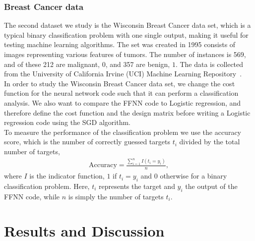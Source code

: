 \documentclass[english,notitlepage,reprint,nofootinbib]{revtex4-2}  %
\begin{document}
\subsubsection*{Breast Cancer data}
The second dataset we study is the Wisconsin Breast Cancer data set, which is a typical binary classification problem with one single output, making it useful for testing machine learning algorithms. The set was created in 1995 consists of images representing various features of tumors. The number of instances is 569, and of these 212 are malignant, $0$, and 357 are benign, $1$. The data is collected from the University of California Irvine (UCI) Machine Learning Repository~\cite{BreastCancerData}. 
\vspace{3mm}
\\ 
In order to study the Wisconsin Breast Cancer data set, we change the cost function for the neural network code such that it can perform a classification analysis. We also want to compare the FFNN code to Logistic regression, and therefore define the cost function and the design matrix before writing a Logistic regression code using the SGD algorithm. 
\vspace{3mm}
\\ 
To measure the performance of the classification problem we use the accuracy score, which is the number of correctly guessed targets $t_i$ divided by the total number of targets, 
\begin{align*}
    \text{Accuracy} = \frac{\sum^n_{i=1} I(t_i=y_i)}{n}, 
\end{align*}
where $I$ is the indicator function, $1$ if $t_i=y_i$ and $0$ otherwise for a binary classification problem. Here, $t_i$ represents the target and $y_i$ the output of the FFNN code, while $n$ is simply the number of targets $t_i$. 



\section{Results and Discussion}\label{sec:results}
\end{document}
